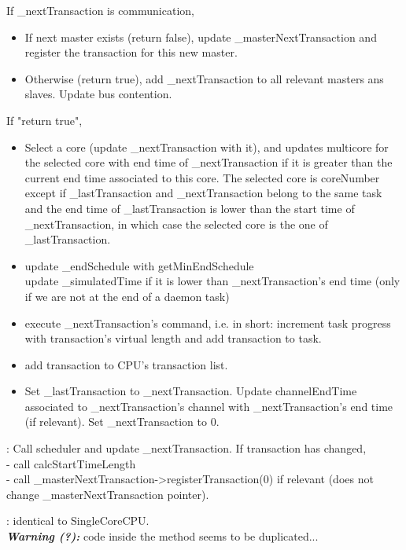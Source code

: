\documentclass[a4paper,11pt]{article}
\newcommand{\bfont}{\fontseries{b}\selectfont}
\newcommand{\cod}[1]{{\ttfamily #1}}
\newcommand{\method}[1]{\par\vspace{1mm}\hspace{-2mm}\colorbox{method}{\textopenbullet\bfont\cod{#1}:}}
\begin{document}
If \cod{\_nextTransaction} is communication,
\begin{itemize}
	\item If next master exists (return false), update \cod{\_masterNextTransaction} and register the transaction for this new master.
	\item Otherwise (return true), add \cod{\_nextTransaction} to all relevant masters ans slaves. Update bus contention.
\end{itemize}
If "return true",
\begin{itemize}
	\item Select a core (update \cod{\_nextTransaction} with it), and updates \cod{multicore} for the selected core with end time of \cod{\_nextTransaction} if it is greater than the current end time associated to this core. The selected core is \cod{coreNumber} except if \cod{\_lastTransaction} and \cod{\_nextTransaction} belong to the same task and the end time of \cod{\_lastTransaction} is lower than the start time of \cod{\_nextTransaction}, in which case the selected core  is the one of  \cod{\_lastTransaction}.
	\item update \cod{\_endSchedule} with \cod{getMinEndSchedule}\\
	update \cod{\_simulatedTime} if it is lower than \cod{\_nextTransaction}'s end time (only if we are not at the end of a daemon task)
	\item execute \cod{\_nextTransaction}'s command, i.e. in short: increment task progress with transaction's virtual length and add transaction to task.
	\item add transaction to CPU's transaction list.
	\item Set \cod{\_lastTransaction} to \cod{\_nextTransaction}. Update \cod{channelEndTime} associated to \cod{\_nextTransaction}'s channel with \cod{\_nextTransaction}'s end time (if relevant). Set \cod{\_nextTransaction} to 0.
\end{itemize}
\method{schedule(iEndSchedule)} Call scheduler and update \cod{\_nextTransaction}. If transaction has changed,\\
- call \cod{calcStartTimeLength}\\
- call \cod{\_masterNextTransaction->registerTransaction(0)} if relevant (does not change \cod{\_masterNextTransaction} pointer).

\method{truncateAndAddNextTransAt(iTime)} identical to \cod{SingleCoreCPU}.\\ {\bfseries\textit{Warning (?):}} code inside the method seems to be duplicated...
\end{document}
